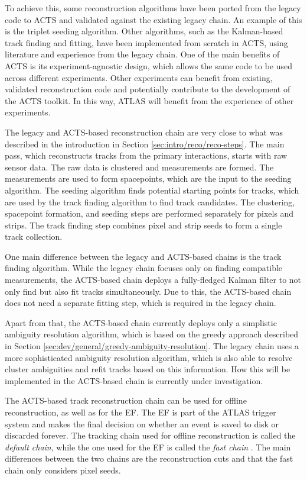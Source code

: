 To achieve this, some reconstruction algorithms have been ported from the legacy code to ACTS and validated against the existing legacy chain. An example of this is the triplet seeding algorithm. Other algorithms, such as the Kalman-based track finding and fitting, have been implemented from scratch in ACTS, using literature and experience from the legacy chain. One of the main benefits of ACTS is its experiment-agnostic design, which allows the same code to be used across different experiments. Other experiments can benefit from existing, validated reconstruction code and potentially contribute to the development of the ACTS toolkit. In this way, ATLAS will benefit from the experience of other experiments.

The legacy and ACTS-based reconstruction chain are very close to what was described in the introduction in Section \ref{sec:intro/reco/reco-steps}. The main pass, which reconstructs tracks from the primary interactions, starts with raw sensor data. The raw data is clustered and measurements are formed. The measurements are used to form spacepoints, which are the input to the seeding algorithm. The seeding algorithm finds potential starting points for tracks, which are used by the track finding algorithm to find track candidates. The clustering, spacepoint formation, and seeding steps are performed separately for pixels and strips. The track finding step combines pixel and strip seeds to form a single track collection.

One main difference between the legacy and ACTS-based chains is the track finding algorithm. While the legacy chain focuses only on finding compatible measurements, the ACTS-based chain deploys a fully-fledged Kalman filter to not only find but also fit tracks simultaneously. Due to this, the ACTS-based chain does not need a separate fitting step, which is required in the legacy chain.

Apart from that, the ACTS-based chain currently deploys only a simplistic ambiguity resolution algorithm, which is based on the greedy approach described in Section \ref{sec:dev/general/greedy-ambiguity-resolution}. The legacy chain uses a more sophisticated ambiguity resolution algorithm, which is also able to resolve cluster ambiguities and refit tracks based on this information. How this will be implemented in the ACTS-based chain is currently under investigation.

The ACTS-based track reconstruction chain can be used for offline reconstruction, as well as for the EF. The EF is part of the ATLAS trigger system and makes the final decision on whether an event is saved to disk or discarded forever. The tracking chain used for offline reconstruction is called the \textit{default chain}, while the one used for the EF is called the \textit{fast chain} \cite{pubnote-2019-041}. The main differences between the two chains are the reconstruction cuts and that the fast chain only considers pixel seeds.

